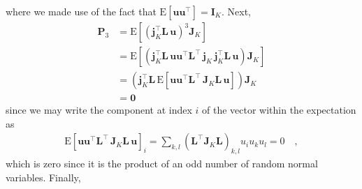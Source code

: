 \documentclass[modern]{aastex62}
\begin{document}
%
where we made use of the fact that $\mathrm{E}\left[ \mathbf{u} \mathbf{u}^\top\right] = \mathbf{I}_K$.
%
Next,
%
\begin{align}
    \mathbf{P}_3 & = \mathrm{E}\left[ \left(\mathbf{j}_K^\top \mathbf{L} \, \mathbf{u}\right)^3 \mathbf{J}_K \right]
    \nonumber                                                                                                                                                                                                       \\
                 & = \mathrm{E}\left[\left(\mathbf{j}_K^\top \mathbf{L} \,  \mathbf{u} \mathbf{u}^\top  \mathbf{L}^\top \, \mathbf{j}_K \, \mathbf{j}_K^\top \mathbf{L} \,  \mathbf{u} \right) \mathbf{J}_K \right]
    \nonumber                                                                                                                                                                                                       \\
                 & = \left(\mathbf{j}_K^\top \mathbf{L} \,  \mathrm{E}\left[\mathbf{u} \mathbf{u}^\top  \mathbf{L}^\top \, \mathbf{J}_K \mathbf{L} \,  \mathbf{u}\right] \right) \mathbf{J}_K
    \nonumber                                                                                                                                                                                                       \\
                 & = \mathbf{0}
\end{align}
%
since we may write the component at index $i$ of the vector within the expectation
as
\begin{align}
    \mathrm{E}\left[\mathbf{u} \mathbf{u}^\top  \mathbf{L}^\top \, \mathbf{J}_K \mathbf{L} \,  \mathbf{u}\right]_{i} = \sum\limits_{k,l}(\mathbf{L}^\top \mathbf{J}_K \mathbf{L})_{k,l} u_i u_k u_l = 0
    \quad,
    \nonumber
\end{align}
%
which is zero since it is the product of an odd number of random normal variables.
Finally,
%
\end{document}

